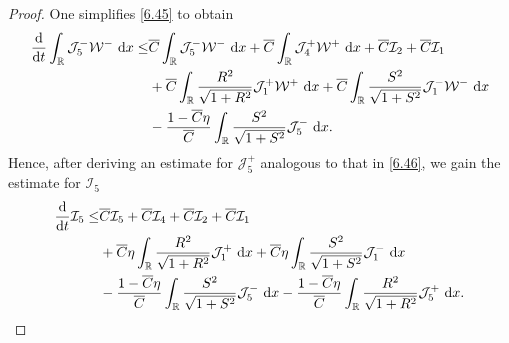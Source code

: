 \documentclass[11pt,reqno]{article}
\newcommand{\fr}{\frac}
\numberwithin{equation}{section}
\begin{document}
\begin{proof}
One simplifies \eqref{6.45} to obtain
\begin{align}\label{6.46}
\begin{split}
\fr{{\rm d}}{{\rm d}t}\int_{\mathbb{R}} \mathcal{J}_{5}^-\mathcal{W}^-\ {\rm d}x
\leq &\overline{C}\int_{\mathbb{R}} \mathcal{J}_{5}^- \mathcal{W}^-\ {\rm d}x +\overline{C}\int_{\mathbb{R}}  \mathcal{J}_{4}^+\mathcal{W}^+\ {\rm d}x +\overline{C}\mathcal{I}_2 +\overline{C}\mathcal{I}_1 \\
 &+\overline{C}\int_{\mathbb{R}}  \fr{R^2}{\sqrt{1+R^2}}\mathcal{J}_{1}^+\mathcal{W}^+\ {\rm d}x
+\overline{C}\int_{\mathbb{R}}  \fr{S^2}{\sqrt{1+S^2}}\mathcal{J}_{1}^-\mathcal{W}^-\ {\rm d}x \\ &-\fr{1-\overline{C}\eta}{\overline{C}}\int_{\mathbb{R}} \fr{S^2}{\sqrt{1+S^2}} \mathcal{J}_{5}^-\ {\rm d}x.
\end{split}
\end{align}
Hence, after deriving an estimate for $\mathcal{J}_{5}^+$ analogous to that in \eqref{6.46}, we gain the estimate for $\mathcal{I}_5$
\begin{align}\label{6.47}
\begin{split}
\fr{{\rm d}}{{\rm d}t}\mathcal{I}_5
\leq &\overline{C}\mathcal{I}_5 +\overline{C}\mathcal{I}_4 +\overline{C}\mathcal{I}_2 +\overline{C}\mathcal{I}_1 \\
 &+\overline{C}\eta\int_{\mathbb{R}}  \fr{R^2}{\sqrt{1+R^2}}\mathcal{J}_{1}^+\ {\rm d}x
+\overline{C}\eta\int_{\mathbb{R}}  \fr{S^2}{\sqrt{1+S^2}}\mathcal{J}_{1}^-\ {\rm d}x \\ &-\fr{1-\overline{C}\eta}{\overline{C}}\int_{\mathbb{R}} \fr{S^2}{\sqrt{1+S^2}} \mathcal{J}_{5}^-\ {\rm d}x -\fr{1-\overline{C}\eta}{\overline{C}}\int_{\mathbb{R}} \fr{R^2}{\sqrt{1+R^2}} \mathcal{J}_{5}^+\ {\rm d}x.
\end{split}
\end{align}



\end{proof}
\end{document}

